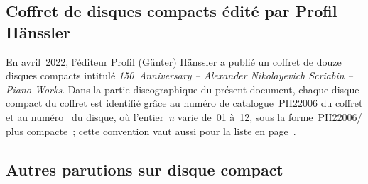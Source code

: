 \subsection{Coffret de disques compacts édité par Profil Hänssler}

En avril~2022, l'éditeur Profil (Günter) Hänssler a publié un coffret de
douze disques compacts intitulé
\foreignlanguage{english}{\emph{150~Anniversary -- Alexander
Nikolayevich Scriabin -- Piano Works}}.
Dans la partie discographique du présent document, chaque disque compact du
coffret est identifié grâce au numéro de catalogue~PH22006 du coffret et au
numéro~ du disque, où l'entier~\textit{n} varie de~01 à~12, sous
la forme~PH22006/ plus compacte~; cette convention vaut aussi
pour la liste en page~\pageref{chap:Contenu}.

\subsection{Autres parutions sur disque compact}

